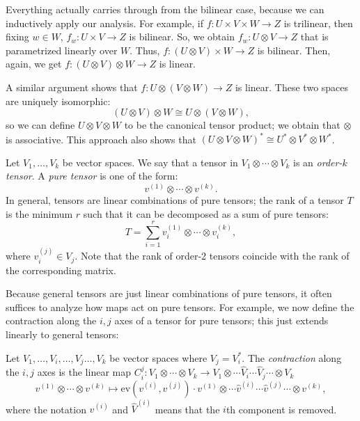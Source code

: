 Everything actually carries through from the bilinear case, because we can inductively apply our analysis. For example, if $f: U \times V \times W \to Z$ is trilinear, then fixing $w \in W$, $f_w : U \times V \to Z$ is bilinear. So, we obtain $f_w : U \otimes V \to Z$ that is parametrized linearly over $W$. Thus, $f: (U \otimes V) \times W \to Z$ is bilinear. Then, again, we get $f: (U \otimes V) \otimes W \to Z$ is linear.


A similar argument shows that $f : U \otimes (V \otimes W) \to Z$ is linear. These two spaces are uniquely isomorphic:
\[(U \otimes V) \otimes W \cong U \otimes (V \otimes W),\]
so we can define $U \otimes V \otimes W$ to be the canonical tensor product; we obtain that $\otimes$ is associative. This approach also shows that $(U \otimes V \otimes W)^* \cong U^* \otimes V^* \otimes W^*$.


\begin{definition}
  Let $V_1, \dotsc, V_k$ be vector spaces. We say that a tensor in $V_1 \otimes \dotsm \otimes V_k$ is an \emph{order-$k$ tensor}. A \emph{pure tensor} is one of the form:
  \[v^{(1)} \otimes \dotsm \otimes v^{(k)}.\]
  In general, tensors are linear combinations of pure tensors; the rank of a tensor $T$  is the minimum $r$ such that it can be decomposed as a sum of pure tensors:
  \[T = \sum_{i=1}^r v^{(1)}_i \otimes \dotsm \otimes v^{(k)}_i,\]
  where $v^{(j)}_i \in V_j$. Note that the rank of order-2 tensors coincide with the rank of the corresponding matrix.
\end{definition}



Because general tensors are just linear combinations of pure tensors, it often suffices to analyze how maps act on pure tensors. For example, we now define the contraction along the $i,j$ axes of a tensor for pure tensors; this just extends linearly to general tensors:
\begin{definition}
  Let $V_1, \dotsc, V_i, \dotsc, V_j \dotsc, V_k$ be vector spaces where $V_j = V_i^*$. The \emph{contraction} along the $i,j$ axes is the linear map $C_i^j : V_1 \otimes \dotsm \otimes V_k \to V_1 \otimes \dotsm \hat{V}_i \dotsm \hat{V}_j \dotsm \otimes V_k$ 
  \[v^{(1)} \otimes  \dotsm \otimes v^{(k)} \mapsto \mathrm{ev}(v^{(i)}, v^{(j)}) \cdot v^{(1)} \otimes \dotsm \hat{v}^{(i)} \dotsm \hat{v}^{(j)} \dotsm \otimes v^{(k)},\]
  where the notation $\hat{v}^{(i)}$ and $\hat{V}^{(i)}$ means that the $i$th component is removed.
\end{definition}




